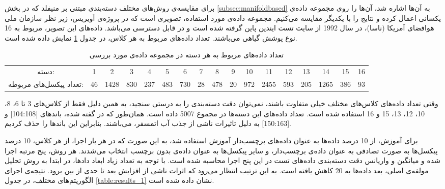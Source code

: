 \documentclass[11pt]{article}
\begin{document}
برای مقایسه‌ی روش‌های مختلف دسته‌بندی مبتنی بر منیفلد که در بخش \ref{subsec:manifoldbased} به آن‌ها اشاره شد، آن‌ها را روی مجموعه داده‌ی یکسانی اعمال کرده و نتایج را با یکدیگر مقایسه می‌کنیم. مجموعه داده‌ی مورد استفاده، تصویری است که در پروژه‌ی آویریس، زیر نظر سازمان ملی هوافضای آمریکا (ناسا)، در سال 1992 از سایت تست ایندین پاین گرفته شده است و در \cite{indian_pine} قابل دسترسی می‌باشد. داده‌های این تصویر، مربوط به 16 نوع پوشش گیاهی می‌‌باشند.
تعداد داده‌های مربوط به هر کلاس، در جدول \ref{table:classes_size} نمایش داده شده است.

\begin{table}
\caption{تعداد داده‌های مربوط به هر دسته در مجموعه داده‌ی مورد بررسی}
\label{table:classes_size}
\begin{center}
\begin{tabular}{|c|c|c|c|c|c|c|c|c|c|c|c|c|c|c|c|c|}
\cline{1-17}
دسته: & 1 & 2 & 3 & 4 & 5 & 6 & 7 & 8 & 9 & 10 & 11 & 12 & 13 & 14 & 15 & 16 \\
\cline{1-17}
تعداد پیکسل‌های مربوطه: & 46  &      1428  &       830  &       237   &      483  &       730  &        28   &      478  &   20   &      972   &     2455    &     593  &       205  
&      1265  &       386 &         93 \\ \hline

\end{tabular}
\end{center}
\end{table}

وقتی تعداد داده‌های کلاس‌های مختلف خیلی متفاوت باشند، نمی‌توان دقت دسته‌بندی را به درستی سنجید، به همین دلیل فقط از کلاس‌های 3 تا  6، 8، 10، 12، 13، 15 و 16 استفاده شده است. تعداد داده‌های این دسته‌ها در مجموع 5007 داده است. همان‌طور که در \cite{book_gustavo} گفته شده، باندهای [104:108]  و [150:163] به دلیل تاثیرات ناشی از جذب آب اتمسفر، \noisy{} می‌باشند. بنابراین این باند‌ها را حذف کردیم.

برای آموزش، از 10 درصد داده‌ها به عنوان داده‌های برچسب‌دار آموزش استفاده شد، به این صورت که در هر بار اجرا، از هر کلاس، 10 درصد پیکسل‌ها به صورت تصادفی به  عنوان داده‌ی برچسب‌دار، و سایر پیکسل‌ها به عنوان داده‌ی بدون برچسب انتخاب می‌شدند. هر روش، پنج مرتبه اجرا شده و میانگین و واریانس دقت دسته‌بندی داده‌های تست در این پنج اجرا محاسبه شده است. با توجه به تعداد زیاد ابعاد داد‌ها، در ابتدا به روش تحلیل مولفه‌ی اصلی، بعد داده‌ها به 20 کاهش یافته است. به این ترتیب انتظار می‌رود که اثرات ناشی از افزایش بعد تا حدی از بین برود.
نتیجه‌ی اجرای الگوریتم‌های مختلف، در جدول \ref{table:results_1} نشان داده شده است. 
\end{document}

